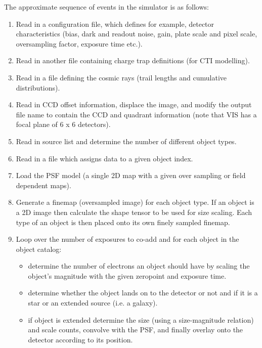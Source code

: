 \documentclass[a4paper,12pt,english]{sphinxmanual}
\begin{document}
The approximate sequence of events in the simulator is as follows:
\begin{enumerate}
\item {} 
Read in a configuration file, which defines for example,
detector characteristics (bias, dark and readout noise, gain,
plate scale and pixel scale, oversampling factor, exposure time etc.).

\item {} 
Read in another file containing charge trap definitions (for CTI modelling).

\item {} 
Read in a file defining the cosmic rays (trail lengths and cumulative distributions).

\item {} 
Read in CCD offset information, displace the image, and modify
the output file name to contain the CCD and quadrant information
(note that VIS has a focal plane of 6 x 6 detectors).

\item {} 
Read in source list and determine the number of different object types.

\item {} 
Read in a file which assigns data to a given object index.

\item {} 
Load the PSF model (a single 2D map with a given over sampling or field dependent maps).

\item {} 
Generate a finemap (oversampled image) for each object type. If an object
is a 2D image then calculate the shape tensor to be used for size scaling.
Each type of an object is then placed onto its own finely sampled finemap.

\item {} 
Loop over the number of exposures to co-add and for each object in the object catalog:
\begin{itemize}
\item {} 
determine the number of electrons an object should have by scaling the object's magnitude
with the given zeropoint and exposure time.

\item {} 
determine whether the object lands on to the detector or not and if it is
a star or an extended source (i.e. a galaxy).

\item {} 
if object is extended determine the size (using a size-magnitude relation) and scale counts,
convolve with the PSF, and finally overlay onto the detector according to its position.


\end{itemize}
\end{enumerate}
\end{document}
